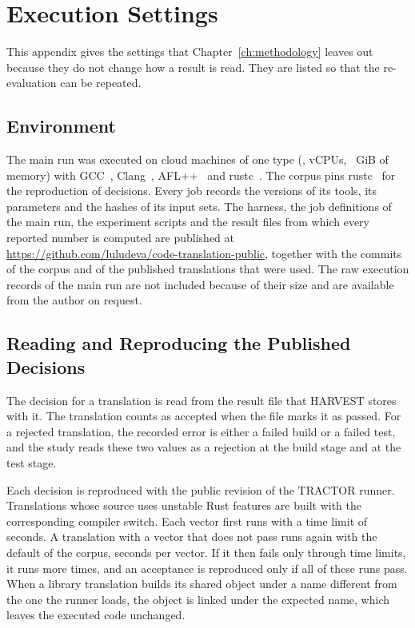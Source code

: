\chapter{Execution Settings}\label{app:settings}

This appendix gives the settings that Chapter~\ref{ch:methodology} leaves out because they do not change how a result is read. They are listed so that the re-evaluation can be repeated.

\section{Environment}\label{app:s-env}

The main run was executed on cloud machines of one type (\sEnvInstance{}, \sEnvVcpu{} vCPUs, \sEnvMemGiB{}~GiB of memory) with GCC~\sEnvGcc{}, Clang~\sEnvClang{}, AFL++~\sEnvAfl{} and rustc~\sEnvRustc{}. The corpus pins rustc~\sEnvRustcCorpus{} for the reproduction of decisions. Every job records the versions of its tools, its parameters and the hashes of its input sets. The harness, the job definitions of the main run, the experiment scripts and the result files from which every reported number is computed are published at \url{https://github.com/luludeva/code-translation-public}, together with the commits of the corpus and of the published translations that were used. The raw execution records of the main run are not included because of their size and are available from the author on request.

\section{Reading and Reproducing the Published Decisions}\label{app:s-repro}

The decision for a translation is read from the result file that HARVEST stores with it. The translation counts as accepted when the file marks it as passed. For a rejected translation, the recorded error is either a failed build or a failed test, and the study reads these two values as a rejection at the build stage and at the test stage.

Each decision is reproduced with the public revision of the TRACTOR runner. Translations whose source uses unstable Rust features are built with the corresponding compiler switch. Each vector first runs with a time limit of \pTimeoutSec{} seconds. A translation with a vector that does not pass runs again with the default of the corpus, \pReproTimeoutFullSec{} seconds per vector. If it then fails only through time limits, it runs \pReproRecheckReps{} more times, and an acceptance is reproduced only if all of these runs pass. When a library translation builds its shared object under a name different from the one the runner loads, the object is linked under the expected name, which leaves the executed code unchanged.

